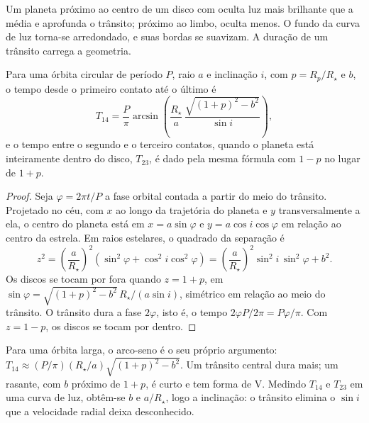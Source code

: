 Um planeta próximo ao centro de um disco com  oculta luz
mais brilhante que a média e aprofunda o trânsito; próximo ao limbo, oculta menos. O
fundo da curva de luz torna-se arredondado, e suas bordas se suavizam. A duração
de um trânsito carrega a geometria.

\begin{theorem}\label{thm:b3:exoplanets:duration}
Para uma órbita circular de período $P$, raio $a$ e inclinação $i$, com
$p = R_p/R_\star$ e  $b$, o tempo desde o primeiro
contato até o último é
\[
T_{14} = \frac{P}{\pi}\arcsin\!\left(\frac{R_\star}{a}\,
          \frac{\sqrt{(1 + p)^2 - b^2}}{\sin i}\right),
\]
e o tempo entre o segundo e o terceiro contatos, quando o planeta está
inteiramente dentro do disco, $T_{23}$, é dado pela mesma fórmula com
$1 - p$ no lugar de $1 + p$.
\end{theorem}

\begin{proof}
Seja $\varphi = 2\pi t/P$ a fase orbital contada a partir do meio do trânsito.
Projetado no céu, com $x$ ao longo da trajetória do planeta e $y$ transversalmente a ela,
o centro do planeta está em $x = a\sin\varphi$ e $y = a\cos i\cos\varphi$
em relação ao centro da estrela. Em raios estelares, o quadrado da separação é
\[
z^2 = \left(\frac{a}{R_\star}\right)^2(\sin^2\varphi + \cos^2 i\cos^2\varphi)
    = \left(\frac{a}{R_\star}\right)^2\sin^2 i\,\sin^2\varphi + b^2 .
\]
Os discos se tocam por fora quando $z = 1 + p$, em
$\sin\varphi = \sqrt{(1 + p)^2 - b^2}\,R_\star/(a\sin i)$, simétrico
em relação ao meio do trânsito. O trânsito dura a fase $2\varphi$, isto é, o
tempo $2\varphi P/2\pi = P\varphi/\pi$. Com $z = 1 - p$, os discos se tocam
por dentro.
\end{proof}

Para uma órbita larga, o arco-seno é o seu próprio argumento: $T_{14} \approx (P/\pi)
(R_\star/a)\sqrt{(1 + p)^2 - b^2}$. Um trânsito central dura mais; um
rasante, com $b$ próximo de $1 + p$, é curto e tem forma de V. Medindo
$T_{14}$ e $T_{23}$ em uma curva de luz, obtêm-se $b$ e $a/R_\star$, logo
a inclinação: o trânsito elimina o $\sin i$ que a velocidade radial
deixa desconhecido.

